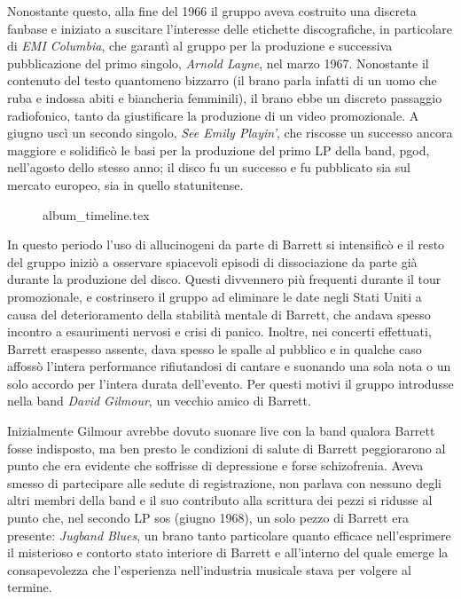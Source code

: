 \documentclass[class=book, crop=false, oneside, 12pt]{standalone}
\begin{document}
    Nonostante questo, alla fine del 1966 il gruppo aveva costruito una discreta fanbase e iniziato a suscitare l'interesse delle etichette discografiche, in particolare di \emph{EMI Columbia}, che garantì al gruppo  per la produzione e successiva pubblicazione del primo singolo, \emph{Arnold Layne}, nel marzo 1967. Nonostante il contenuto del testo quantomeno bizzarro (il brano parla infatti di un uomo che ruba e indossa abiti e biancheria femminili), il brano ebbe un discreto passaggio radiofonico, tanto da giustificare la produzione di un video promozionale. A giugno uscì un secondo singolo, \emph{See  Emily Playin'}, che riscosse un successo ancora maggiore e solidificò le basi per la produzione del primo LP della band, \acrfull{pgod}, nell'agosto dello stesso anno; il disco fu un successo e fu pubblicato sia sul mercato europeo, sia in quello statunitense. 
    \begin{figure}
        \centering
        {album_timeline.tex}
        \label{fig:album_timeline}
    \end{figure}
    
    In questo periodo l'uso di allucinogeni da parte di Barrett si intensificò e il resto del gruppo iniziò a osservare spiacevoli episodi di dissociazione da parte già durante la produzione del disco. Questi divvennero più frequenti durante il tour promozionale, e costrinsero il gruppo ad eliminare le date negli Stati Uniti a causa del deterioramento della stabilità mentale di Barrett, che andava spesso incontro a esaurimenti nervosi e crisi di panico. Inoltre, nei concerti effettuati, Barrett eraspesso assente, dava spesso le spalle al pubblico e in qualche caso affossò l'intera performance rifiutandosi di cantare e suonando una sola nota o un solo accordo per l'intera durata dell'evento. Per questi motivi il gruppo introdusse nella band \emph{David Gilmour}, un vecchio amico di Barrett. 
    
    Inizialmente Gilmour avrebbe dovuto suonare live con la band qualora Barrett fosse indisposto, ma ben presto le condizioni di salute di Barrett peggiorarono al punto che era evidente che soffrisse di depressione e forse schizofrenia. Aveva smesso di partecipare alle sedute di registrazione, non parlava con nessuno degli altri membri della band e il suo contributo alla scrittura dei pezzi si ridusse al punto che, nel secondo LP \acrfull{sos} (giugno 1968), un solo pezzo di Barrett era presente: \emph{Jugband Blues}, un brano tanto particolare quanto efficace nell'esprimere il misterioso e contorto stato interiore di Barrett e all'interno del quale emerge la consapevolezza che l'esperienza nell'industria musicale stava per volgere al termine.
    
\end{document}
